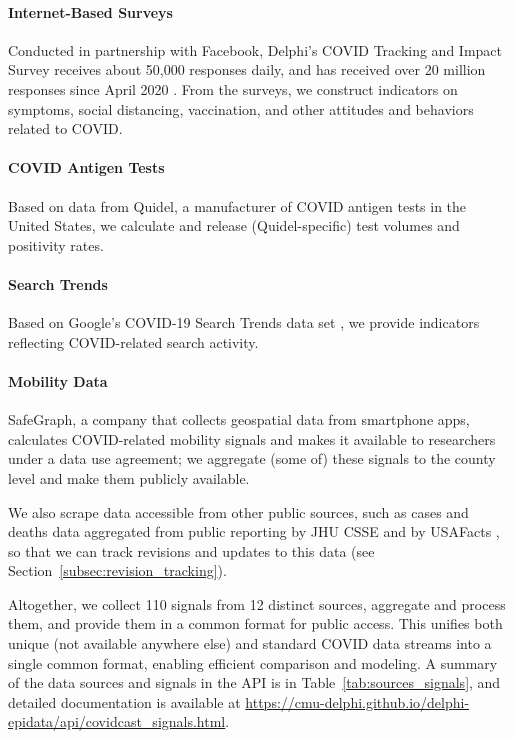 \documentclass[9pt,twocolumn,twoside,lineno]{pnas-new}
\begin{document}
\paragraph{Internet-Based Surveys} Conducted in partnership with Facebook,
Delphi's COVID Tracking and Impact Survey receives about 50,000 responses daily,  
and has received over 20 million responses since April 2020 \cite{DelphiSurvey,
  Kreuter:2020}. From the surveys, we construct indicators on symptoms, social 
distancing, vaccination, and other attitudes and behaviors related to COVID.

\paragraph{COVID Antigen Tests} Based on data from Quidel, a manufacturer of
COVID antigen tests in the United States, we calculate and release
(Quidel-specific) test volumes and positivity rates.  

\paragraph{Search Trends} Based on Google's COVID-19 Search Trends data set
\cite{GoogleSymptoms}, we provide indicators reflecting COVID-related search  
activity.

\paragraph{Mobility Data} SafeGraph, a company that collects geospatial data
from smartphone apps, calculates COVID-related mobility signals
\cite{SafeGraphSocial, SafeGraphPatterns} and makes it available to researchers 
under a data use agreement; we aggregate (some of) these signals to the county
level and make them publicly available.     

\medskip
We also scrape data accessible from other public sources, such as cases and
deaths data aggregated from public reporting by JHU CSSE \cite{Dong:2020} and by
USAFacts \cite{USAFacts}, so that we can track revisions and updates to this data
(see Section~\ref{subsec:revision_tracking}).

Altogether, we collect 110 signals from 12 distinct sources, aggregate and
process them, and provide them in a common format for public access. This
unifies both unique (not available anywhere else) and standard COVID data
streams into a single common format, enabling efficient comparison and modeling.
A summary of the data sources and signals in the API is in
Table~\ref{tab:sources_signals}, and detailed documentation is available at 
\url{https://cmu-delphi.github.io/delphi-epidata/api/covidcast_signals.html}.
\end{document}
